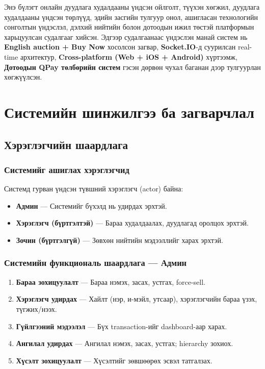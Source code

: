 \documentclass[12pt, a4paper]{report}
\begin{document}
Энэ бүлэгт онлайн дуудлага худалдааны үндсэн ойлголт, түүхэн хөгжил, дуудлага худалдааны үндсэн төрлүүд, эдийн засгийн тулгуур онол, ашигласан технологийн сонголтын үндэслэл, дэлхий нийтийн болон дотоодын ижил төстэй платформын харьцуулсан судалгааг хийсэн. Эдгээр судалгаанаас үндэслэн манай систем нь \textbf{English auction + Buy Now} хосолсон загвар, \textbf{Socket.IO}-д суурилсан real-time архитектур, \textbf{Cross-platform (Web + iOS + Android)} хүртээмж, \textbf{Дотоодын QPay төлбөрийн систем} гэсэн дөрвөн чухал баганан дээр тулгуурлан хөгжүүлсэн.

\chapter{Системийн шинжилгээ ба загварчлал}

\section{Хэрэглэгчийн шаардлага}

\subsection{Системийг ашиглах хэрэглэгчид}

Системд гурван үндсэн түвшний хэрэглэгч (actor) байна:

\begin{itemize}
  \item \textbf{Админ} — Системийг бүхэлд нь удирдах эрхтэй.
  \item \textbf{Хэрэглэгч (бүртгэлтэй)} — Бараа худалдаалах, дуудлагад оролцох эрхтэй.
  \item \textbf{Зочин (бүртгэлгүй)} — Зөвхөн нийтийн мэдээллийг харах эрхтэй.
\end{itemize}

\subsection{Системийн функциональ шаардлага — Админ}

\begin{enumerate}
  \item \textbf{Бараа зохицуулалт} — Бараа нэмэх, засах, устгах, force-sell.
  \item \textbf{Хэрэглэгч удирдах} — Хайлт (нэр, и-мэйл, утсаар), хэрэглэгчийн бараа үзэх, түгжих/нээх.
  \item \textbf{Гүйлгээний мэдээлэл} — Бүх transaction-ийг dashboard-аар харах.
  \item \textbf{Ангилал удирдах} — Ангилал нэмэх, засах, устгах; hierarchy зохиох.
  \item \textbf{Хүсэлт зохицуулалт} — Хүсэлтийг зөвшөөрөх эсвэл татгалзах.
\end{enumerate}
\end{document}
